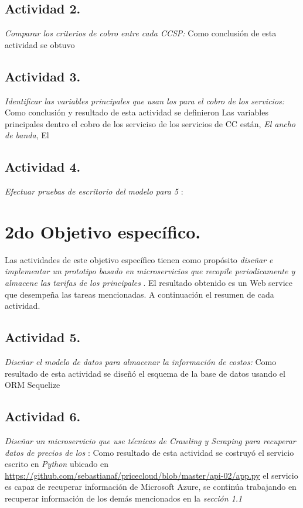 \subsection{Actividad 2.}
\emph{Comparar los criterios de cobro entre cada \acrshort{CCSP}:}
\newline\newline
Como conclusión de esta actividad se obtuvo 

\subsection{Actividad 3.}
\emph{Identificar las variables principales que usan los  para el cobro de los servicios:}
\newline\newline
Como conclusión y resultado de esta actividad se definieron Las variables principales dentro el cobro de los serviciso de los servicios de \acrshort{CC} están, \emph{El ancho de banda}, El 

\subsection{Actividad 4.}
\emph{Efectuar pruebas de escritorio del modelo para 5 }:
\newline\newline

\section{2do Objetivo específico.}
Las actividades de este objetivo específico tienen como propósito \emph{diseñar e implementar un prototipo basado en microservicios que recopile periodicamente y almacene las tarifas de los principales }. El resultado obtenido es un Web service que desempeña las tareas mencionadas. A continuación el resumen de cada actividad.

\subsection{Actividad 5.}
\emph{Diseñar el modelo de datos para almacenar la información de costos:}
\newline\newline
Como resultado de esta actividad se diseñó el esquema de la base de datos usando el \acrshort{ORM} \gls{Sequelize} 

\subsection{Actividad 6.}
\emph{Diseñar un microservicio que use técnicas de \emph{Crawling} y \emph{Scraping} para recuperar datos de precios de los }:
\newline\newline
Como resultado de esta actividad se costruyó el servicio escrito en \emph{Python} ubicado en \url{https://github.com/sebastianaf/pricecloud/blob/master/api-02/app.py} el servicio es capaz de recuperar información de \gls{Microsoft Azure}, se continúa trabajando en recuperar información de los demás  mencionados en la \emph{sección 1.1}

